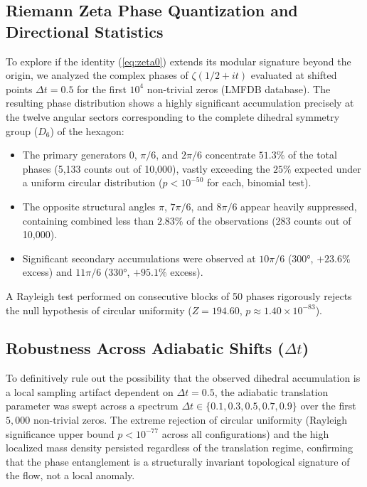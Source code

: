 \documentclass[10pt,a4paper]{article}
\begin{document}
\subsection{Riemann Zeta Phase Quantization and Directional Statistics}
To explore if the identity (\ref{eq:zeta0}) extends its modular signature beyond the origin, we analyzed the complex phases of \(\zeta(1/2+it)\) evaluated at shifted points \(\Delta t = 0.5\) for the first \(10^4\) non-trivial zeros (LMFDB database).
The resulting phase distribution shows a highly significant accumulation precisely at the twelve angular sectors corresponding to the complete dihedral symmetry group (\(D_6\)) of the hexagon:
\begin{itemize}
    \item The primary generators \(0\), \(\pi/6\), and \(2\pi/6\) concentrate \(51.3\%\) of the total phases (5,133 counts out of 10,000), vastly exceeding the \(25\%\) expected under a uniform circular distribution (\(p < 10^{-50}\) for each, binomial test).
    \item The opposite structural angles \(\pi\), \(7\pi/6\), and \(8\pi/6\) appear heavily suppressed, containing combined less than \(2.83\%\) of the observations (283 counts out of 10,000).
    \item Significant secondary accumulations were observed at \(10\pi/6\) (300°, \(+23.6\%\) excess) and \(11\pi/6\) (330°, \(+95.1\%\) excess).
\end{itemize}
A Rayleigh test performed on consecutive blocks of 50 phases rigorously rejects the null hypothesis of circular uniformity (\(Z = 194.60\), \(p \approx 1.40 \times 10^{-83}\)).

\subsection{Robustness Across Adiabatic Shifts (\texorpdfstring{\(\Delta t\)}{Delta t})}
To definitively rule out the possibility that the observed dihedral accumulation is a local sampling artifact dependent on \(\Delta t = 0.5\), the adiabatic translation parameter was swept across a spectrum \(\Delta t \in \{0.1, 0.3, 0.5, 0.7, 0.9\}\) over the first \(5,000\) non-trivial zeros.
The extreme rejection of circular uniformity (Rayleigh significance upper bound \(p < 10^{-77}\) across all configurations) and the high localized mass density persisted regardless of the translation regime, confirming that the phase entanglement is a structurally invariant topological signature of the flow, not a local anomaly.
\end{document}
